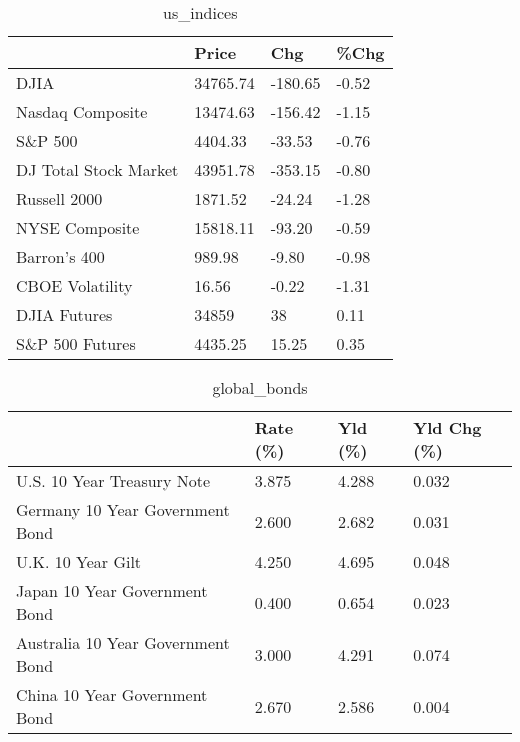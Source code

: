 \documentclass{article}%
\begin{document}
%


\begin{table}[htbp]%
\caption{us\_indices}%
\centering%
\begin{adjustbox}{width=1\textwidth}%
\begin{tabular}{llll}
\toprule
                      &    Price &     Chg &  \%Chg \\
\midrule
                 DJIA & 34765.74 & -180.65 & -0.52 \\
     Nasdaq Composite & 13474.63 & -156.42 & -1.15 \\
              S\&P 500 &  4404.33 &  -33.53 & -0.76 \\
DJ Total Stock Market & 43951.78 & -353.15 & -0.80 \\
         Russell 2000 &  1871.52 &  -24.24 & -1.28 \\
       NYSE Composite & 15818.11 &  -93.20 & -0.59 \\
         Barron's 400 &   989.98 &   -9.80 & -0.98 \\
      CBOE Volatility &    16.56 &   -0.22 & -1.31 \\
         DJIA Futures &    34859 &      38 &  0.11 \\
      S\&P 500 Futures &  4435.25 &   15.25 &  0.35 \\
\bottomrule
\end{tabular}
%
\end{adjustbox}%
\end{table}

%


\begin{table}[htbp]%
\caption{global\_bonds}%
\centering%
\begin{adjustbox}{width=1\textwidth}%
\begin{tabular}{llll}
\toprule
                                  & Rate (\%) & Yld (\%) & Yld Chg (\%) \\
\midrule
       U.S. 10 Year Treasury Note &    3.875 &   4.288 &       0.032 \\
  Germany 10 Year Government Bond &    2.600 &   2.682 &       0.031 \\
                U.K. 10 Year Gilt &    4.250 &   4.695 &       0.048 \\
    Japan 10 Year Government Bond &    0.400 &   0.654 &       0.023 \\
Australia 10 Year Government Bond &    3.000 &   4.291 &       0.074 \\
    China 10 Year Government Bond &    2.670 &   2.586 &       0.004 \\
\bottomrule
\end{tabular}
%
\end{adjustbox}%
\end{table}
\end{document}

